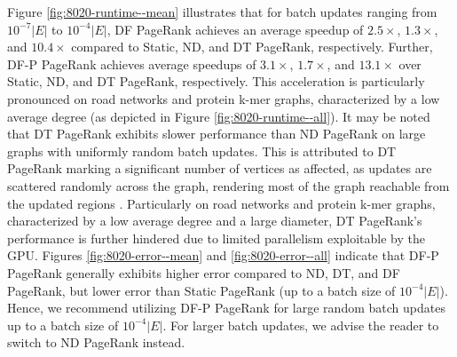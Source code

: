 Figure \ref{fig:8020-runtime--mean} illustrates that for batch updates ranging from $10^{-7}|E|$ to $10^{-4}|E|$, DF PageRank achieves an average speedup of $2.5\times$, $1.3\times$, and $10.4\times$ compared to Static, ND, and DT PageRank, respectively. Further, DF-P PageRank achieves average speedups of $3.1\times$, $1.7\times$, and $13.1\times$ over Static, ND, and DT PageRank, respectively. This acceleration is particularly pronounced on road networks and protein k-mer graphs, characterized by a low average degree (as depicted in Figure \ref{fig:8020-runtime--all}). It may be noted that DT PageRank exhibits slower performance than ND PageRank on large graphs with uniformly random batch updates. This is attributed to DT PageRank marking a significant number of vertices as affected, as updates are scattered randomly across the graph, rendering most of the graph reachable from the updated regions \cite{sahu2024incrementally}. Particularly on road networks and protein k-mer graphs, characterized by a low average degree and a large diameter, DT PageRank's performance is further hindered due to limited parallelism exploitable by the GPU. Figures \ref{fig:8020-error--mean} and \ref{fig:8020-error--all} indicate that DF-P PageRank generally exhibits higher error compared to ND, DT, and DF PageRank, but lower error than Static PageRank (up to a batch size of $10^{-4}|E|$). Hence, we recommend utilizing DF-P PageRank for large random batch updates up to a batch size of $10^{-4}|E|$. For larger batch updates, we advise the reader to switch to ND PageRank instead.





\ignore{}
